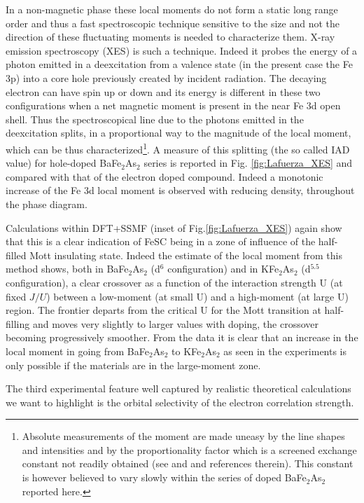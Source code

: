 \documentclass[12pt,twoside]{article}
\begin{document}
In a non-magnetic phase these local moments do not form a static long range order and thus a fast spectroscopic technique sensitive to the size and not the direction of these fluctuating moments is needed to characterize them. X-ray emission spectroscopy (XES) is such a technique. Indeed it probes the energy of a photon emitted in a deexcitation from a valence state (in the present case the Fe 3p) into a core hole previously created by incident radiation. The decaying electron can have spin up or down and its energy is different in these two configurations when a net magnetic moment is present in the near Fe 3d open shell. Thus the spectroscopical line due to the photons emitted in the deexcitation splits, in a proportional way to the magnitude of the local moment, which can be thus characterized\footnote{Absolute measurements of the moment are made uneasy by the line shapes and intensities and by the proportionality factor which is a screened exchange constant not readily obtained (see and \cite{Gretarsson_LocalMoments,Lafuerza_XES_122} and references therein). This constant is however believed to vary slowly within the series of doped BaFe$_2$As$_2$ reported here.}. 
A measure of this splitting (the so called IAD value\cite{Gretarsson_LocalMoments,Lafuerza_XES_122}) for hole-doped BaFe$_2$As$_2$ series is reported in Fig. \ref{fig:Lafuerza_XES} and compared with that of the electron doped compound. Indeed a monotonic increase of the Fe 3d local moment is observed with reducing density, throughout the phase diagram.

Calculations within DFT+SSMF (inset of Fig.\ref{fig:Lafuerza_XES}) again show that this is a clear indication of FeSC being in a zone of influence of the half-filled Mott insulating state. Indeed the estimate of the local moment from this method shows, both in BaFe$_2$As$_2$ (d$^6$ configuration) and in KFe$_2$As$_2$ (d$^{5.5}$ configuration), a clear crossover as a function of the interaction strength U (at fixed $J/U$) between a low-moment (at small U) and a high-moment (at large U) region. The frontier departs from the critical U for the Mott transition at half-filling and moves very slightly to larger values with doping, the crossover becoming progressively smoother. From the data it is clear that an increase in the local moment in going from BaFe$_2$As$_2$ to KFe$_2$As$_2$ as seen in the experiments is only possible if the materials are in the large-moment zone.


The third experimental feature well captured by realistic theoretical calculations we want to highlight is the orbital selectivity of the electron correlation strength. 
 
\end{document}
